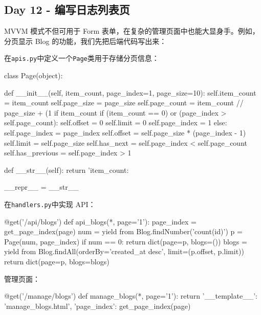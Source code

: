 \hypertarget{day-12---ux7f16ux5199ux65e5ux5fd7ux5217ux8868ux9875}{%
\subsection{Day 12 -
编写日志列表页}\label{day-12---ux7f16ux5199ux65e5ux5fd7ux5217ux8868ux9875}}

MVVM 模式不但可用于 Form
表单，在复杂的管理页面中也能大显身手。例如，分页显示 Blog
的功能，我们先把后端代码写出来：

在\texttt{apis.py}中定义一个\texttt{Page}类用于存储分页信息：

\begin{pythoncode}
class Page(object):

    def __init__(self, item_count, page_index=1, page_size=10):
        self.item_count = item_count
        self.page_size = page_size
        self.page_count = item_count // page_size + (1 if item_count %
        if (item_count == 0) or (page_index > self.page_count):
            self.offset = 0
            self.limit = 0
            self.page_index = 1
        else:
            self.page_index = page_index
            self.offset = self.page_size * (page_index - 1)
            self.limit = self.page_size
        self.has_next = self.page_index < self.page_count
        self.has_previous = self.page_index > 1

    def __str__(self):
        return 'item_count: %

    __repr__ = __str__
\end{pythoncode}

在\texttt{handlers.py}中实现 API：

\begin{pythoncode}
@get('/api/blogs')
def api_blogs(*, page='1'):
    page_index = get_page_index(page)
    num = yield from Blog.findNumber('count(id)')
    p = Page(num, page_index)
    if num == 0:
        return dict(page=p, blogs=())
    blogs = yield from Blog.findAll(orderBy='created_at desc', limit=(p.offset, p.limit))
    return dict(page=p, blogs=blogs)
\end{pythoncode}

管理页面：

\begin{pythoncode}
@get('/manage/blogs')
def manage_blogs(*, page='1'):
    return {
        '__template__': 'manage_blogs.html',
        'page_index': get_page_index(page)
    }
\end{pythoncode}

